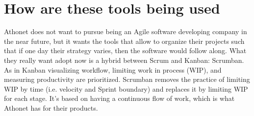 \section{How are these tools being used}
	Athonet does not want to pursue being an Agile software developing company in the near future, but it wants the tools that allow to organize their projects such that if one day their strategy varies, then the software would follow along.
	What they really want adopt now is a hybrid between Scrum and Kanban: Scrumban.\\	
	As in Kanban visualizing workflow, limiting work in process (WIP), and measuring productivity are prioritized.	
	Scrumban removes the practice of limiting WIP by time (i.e. velocity and Sprint boundary) and replaces it by limiting WIP for each stage.
	It's based on having a continuous flow of work, which is what Athonet has for their products.\\	
	
